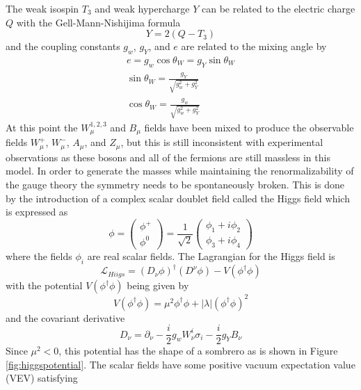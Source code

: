 The weak isospin $T_3$ and weak hypercharge $Y$ can be related to the electric charge $Q$ with the Gell-Mann-Nishijima formula
\begin{equation}
	Y = 2(Q-T_3)
\end{equation}
and the coupling constants $g_w$, $g_Y$, and $e$ are related to the mixing angle by
\begin{eqnarray}
	e = g_w\cos\theta_W = g_Y\sin\theta_W \\
	\sin\theta_W = \frac{g_Y}{\sqrt{g_w^2 + g_Y^2}} \\
	\cos\theta_W = \frac{g_w}{\sqrt{g_w^2 + g_Y^2}}
\end{eqnarray}
At this point the $W_\mu^{1,2,3}$ and $B_\mu$ fields have been mixed to produce the observable fields $W_\mu^+$, $W_\mu^-$, $A_\mu$, and $Z_\mu$, but this is still inconsistent with experimental observations as these bosons and all of the fermions are still massless in this model.  In order to generate the masses while maintaining the renormalizability of the gauge theory the symmetry needs to be spontaneously broken.  This is done by the introduction of a complex scalar doublet field called the Higgs field which is expressed as
\begin{equation}
	\phi = 
	\left(
	\begin{array}{c}
		\phi^+ \\
		\phi^0
	\end{array}
	\right) = 
	\frac{1}{\sqrt{2}}\left(
	\begin{array}{c}
		\phi_1 + i\phi_2 \\
		\phi_3 + i\phi_4 
	\end{array}
	\right)
\end{equation}
where the fields $\phi_i$ are real scalar fields.  
The Lagrangian for the Higgs field is
\begin{equation}
	\mathcal{L}_{Hiigs} = (D_\nu\phi)^\dagger (D^\nu\phi) - V(\phi^\dagger \phi)
	\label{equation:higgsL}
\end{equation}
with the potential $V(\phi^\dagger \phi)$ being given by 
\begin{equation}
	V(\phi^\dagger \phi) = \mu^2\phi^\dagger \phi + |\lambda|(\phi^\dagger \phi)^2
\end{equation}
and the covariant derivative
\begin{equation}
	D_\nu = \partial_\nu - \frac{i}{2} g_wW_\nu^i \sigma_i - \frac{i}{2}g_YB_\nu
\end{equation}
Since $\mu^2<0$, this potential has the shape of a sombrero as is shown in Figure \ref{fig:higgspotential}.  The scalar fields have some positive vacuum expectation value (VEV) satisfying 
